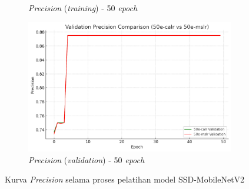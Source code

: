 \begin{figure}[htbp]
\begin{subfigure}{0.45\textwidth}
    \caption{\emph{Precision} (\emph{training}) - 50 \emph{epoch}}
  \end{subfigure}
  \hfill
  \begin{subfigure}{0.45\textwidth}
    \includegraphics[width=\textwidth]{gambar/bab4-val-precision-50e.png}
    \caption{\emph{Precision} (\emph{validation}) - 50 \emph{epoch}}
  \end{subfigure}
  \caption{Kurva \emph{Precision} selama proses pelatihan model SSD-MobileNetV2}
  \label{fig:precision_curves}
\end{figure}

